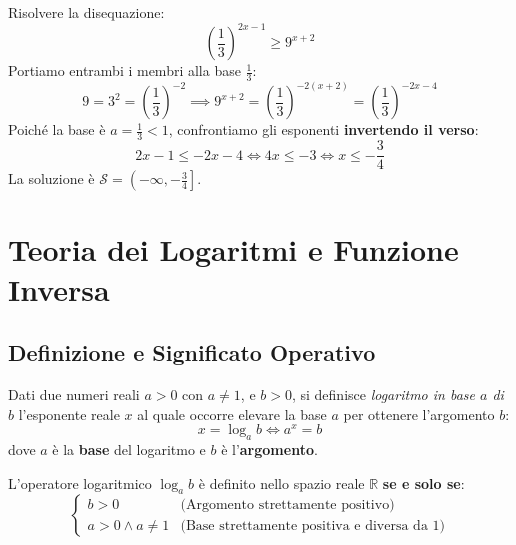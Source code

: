 \documentclass[11pt,a4paper,oneside]{report}
\begin{document}
\begin{esempio}
Risolvere la disequazione:
\begin{equation*}
    \left(\frac{1}{3}\right)^{2x - 1} \ge 9^{x+2}
\end{equation*}
Portiamo entrambi i membri alla base $\frac{1}{3}$:
\begin{equation*}
    9 = 3^2 = \left(\frac{1}{3}\right)^{-2} \implies 9^{x+2} = \left(\frac{1}{3}\right)^{-2(x+2)} = \left(\frac{1}{3}\right)^{-2x - 4}
\end{equation*}
Poiché la base è $a = \frac{1}{3} < 1$, confrontiamo gli esponenti \textbf{invertendo il verso}:
\begin{equation*}
    2x - 1 \le -2x - 4 \iff 4x \le -3 \iff x \le -\frac{3}{4}
\end{equation*}
La soluzione è $\mathcal{S} = \left(-\infty, -\frac{3}{4}\right]$.
\end{esempio}

\newpage

\chapter{Teoria dei Logaritmi e Funzione Inversa}

\section{Definizione e Significato Operativo}

\begin{definizione}[Logaritmo]
Dati due numeri reali $a > 0$ con $a \neq 1$, e $b > 0$, si definisce \emph{logaritmo in base $a$ di $b$} l'esponente reale $x$ al quale occorre elevare la base $a$ per ottenere l'argomento $b$:
\begin{equation}
    x = \log_a b \iff a^x = b
\end{equation}
dove $a$ è la \textbf{base} del logaritmo e $b$ è l'\textbf{argomento}.
\end{definizione}

\begin{attenzione}
L'operatore logaritmico $\log_a b$ è definito nello spazio reale $\mathbb{R}$ \textbf{se e solo se}:
\begin{equation}
    \begin{cases}
        b > 0 & \text{(Argomento strettamente positivo)} \\[1.6ex]
        a > 0 \land a \neq 1 & \text{(Base strettamente positiva e diversa da 1)}
    \end{cases}
\end{equation}
\end{attenzione}
\end{document}
